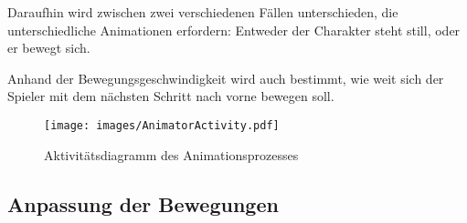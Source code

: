 Daraufhin wird zwischen zwei verschiedenen Fällen unterschieden, die unterschiedliche Animationen erfordern: Entweder der Charakter steht still, oder er bewegt sich.

Anhand der Bewegungsgeschwindigkeit wird auch bestimmt, wie weit sich der Spieler mit dem nächsten Schritt nach vorne bewegen soll.


\begin{figure}
    \centering
    \texttt{[image: images/AnimatorActivity.pdf]}
    \caption{Aktivitätsdiagramm des Animationsprozesses}
    \label{uml_activity}
\end{figure}

\subsection{Anpassung der Bewegungen}
